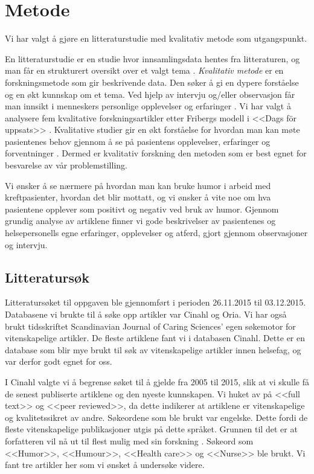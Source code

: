 \chapter{Metode}

Vi har valgt å gjøre en litteraturstudie med kvalitativ metode som
utgangspunkt.

En litteraturstudie er en studie hvor innsamlingsdata hentes fra litteraturen,
og man får en strukturert oversikt over et valgt tema \cite{segesten2006}.
\textit{Kvalitativ metode} er en forskningsmetode som gir beskrivende data. Den
søker å gi en dypere forståelse og en økt kunnskap om et tema. Ved hjelp av
intervju og/eller observasjon får man innsikt i menneskers personlige
opplevelser og erfaringer \cite{olsson2003}. Vi har valgt å analysere fem
kvalitative forskningsartikler etter Fribergs modell i <<Dags för uppsats>>
\citeyear{friberg2006}. Kvalitative studier gir en økt forståelse for hvordan
man kan møte pasientenes behov gjennom å se på pasientens opplevelser,
erfaringer og forventninger \cite{segesten2006}. Dermed er kvalitativ forskning
den metoden som er best egnet for besvarelse av vår problemstilling.

Vi ønsker å se nærmere på hvordan man kan bruke humor i arbeid med
kreftpasienter, hvordan det blir mottatt, og vi ønsker å vite noe om hva
pasientene opplever som positivt og negativ ved bruk av humor. Gjennom grundig
analyse av artiklene finner vi gode beskrivelser av pasientenes og
helsepersonells egne erfaringer, opplevelser og atferd, gjort gjennom
observasjoner og intervju.

\section{Litteratursøk}

Litteratursøket til oppgaven ble gjennomført i perioden 26.11.2015 til
03.12.2015. Databasene vi brukte til å søke opp artikler var Cinahl og Oria. Vi
har også brukt tidsskriftet Scandinavian Journal of Caring Sciences' egen
søkemotor for vitenskapelige artikler. De fleste artiklene fant vi i databasen
Cinahl. Dette er en database som blir mye brukt til søk av vitenskapelige
artikler innen helsefag, og var derfor godt egnet for oss.

I Cinahl valgte vi å begrense søket til å gjelde fra 2005 til 2015, slik at vi
skulle få de senest publiserte artiklene og den nyeste kunnskapen. Vi huket av
på <<full text>> og <<peer reviewed>>, da dette indikerer at artiklene er
vitenskapelige og kvalitetssikret av andre. Søkeordene som ble brukt var
engelske. Dette fordi de fleste vitenskapelige publikasjoner utgis på dette
språket. Grunnen til det er at forfatteren vil nå ut til flest mulig med sin
forskning \cite{friberg2006}. Søkeord som <<Humor>>, <<Humour>>, <<Health
care>> og <<Nurse>> ble brukt. Vi fant tre artikler her som vi ønsket å
undersøke videre.

